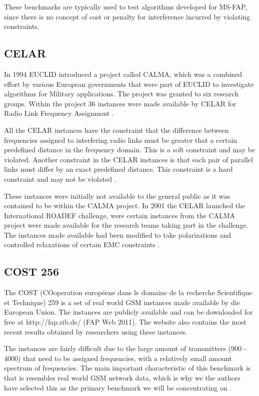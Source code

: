 These benchmarks are typically used to test algorithms developed for MS-FAP, since there is no concept of cost or penalty for interference incurred by violating constraints.
\subsection{CELAR}
In 1994 EUCLID introduced a project called CALMA, which was a combined effort by various European governments that were part of EUCLID to investigate algorithms for Military applications. The project was granted to six research groups. Within the project 36 instances were made available by CELAR for Radio Link Frequency Assignment \cite{Karen2004,DynamicFAP}.

All the CELAR instances have the constraint that the difference between frequencies assigned to interfering radio links must be greater that a certain predefined distance in the frequency domain. This is a soft constraint and may be violated. Another constraint in the CELAR instances is that each pair of parallel links must differ by an exact predefined distance. This constraint is a hard constraint and may not be violated \cite{DynamicFAP}.

These instances were initially not available to the general public as it was contained to be within the CALMA project. In 2001 the CELAR launched the International ROADEF challenge, were certain instances from the CALMA project were made available for the research teams taking part in the challenge. The instances made available had been modified to take polarizations and controlled relaxations of certain EMC constraints \cite{LowerPolarFAP}.
\subsection{COST 256}
The COST (COoperation européene dans le domaine de la recherche Scientifique et Technique) 259 is a set of real world GSM instances made available by die European Union. The instances are publicly available and can  be downloaded for free at http://fap.zib.de/ (FAP Web 2011). The website also contains the most recent results obtained by researchers using these instances\cite{Karen2004,Eisenblatter}.

The instances are fairly difficult due to the large amount of transmitters (900 - 4000) that need to be assigned frequencies, with a relatively small amount spectrum of frequencies. The main important characteristic of this benchmark is that is resembles real world GSM network data, which is why we the authors have selected this as the primary benchmark we will be concentrating on \cite{Karen2004,FAPWeb}.

